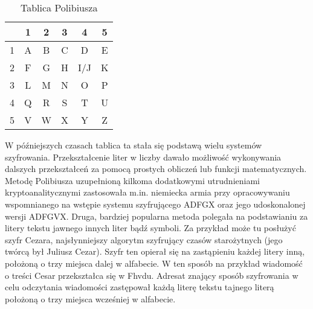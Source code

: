 \documentclass[a4paper, 10pt] {article}
\begin{document}
\begin{table}[h]
\centering
\caption{Tablica Polibiusza}\begin{tabular}{|c|c|c|c|c|c|}
\hline
& 1 & 2 & 3 & 4 & 5 \\
\hline
1 & A & B & C & D & E\\
\hline
2 & F & G & H & I/J & K\\
\hline
3 & L & M & N & O & P\\
\hline
4 & Q & R & S & T & U\\
\hline
5 & V & W & X & Y & Z\\
\hline
\end{tabular}
\end{table}
W późniejszych czasach tablica ta stała się podstawą wielu systemów szyfrowania. Przekształcenie liter w liczby dawało możliwość wykonywania dalszych przekształceń za pomocą prostych obliczeń lub funkcji matematycznych. Metodę Polibiusza uzupełnioną kilkoma dodatkowymi utrudnieniami kryptoanalitycznymi zastosowała m.in. niemiecka armia przy opracowywaniu wspomnianego na wstępie systemu szyfrującego ADFGX oraz jego udoskonalonej wersji ADFGVX. Druga, bardziej popularna metoda polegała na podstawianiu za litery tekstu jawnego innych liter bądź symboli. Za przykład może tu posłużyć szyfr Cezara, najsłynniejszy algorytm szyfrujący czasów starożytnych (jego twórcą był Juliusz Cezar). Szyfr ten opierał się na zastąpieniu każdej litery inną, położoną o trzy miejsca dalej w alfabecie. W ten sposób na przykład wiadomość o treści Cesar przekształca się w Fhvdu. Adresat znający sposób szyfrowania w celu odczytania wiadomości zastępował każdą literę tekstu tajnego literą położoną o trzy miejsca wcześniej w alfabecie.
\end{document}
